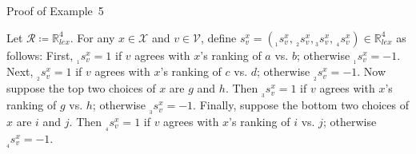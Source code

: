 \documentclass[
]{article}
\begin{document}
Proof of Example~5

Let \(\mathcal{R} ≔ \mathbb{R}_{lex}^{4}\). For any
\(x \in \mathcal{X}\) and \(v \in \mathcal{V}\), define
\(s_{v}^{x} = \left( {}_{{}_{1}}s_{v}^{x},\,{}_{{}_{2}}s_{v}^{x},{}_{{}_{3}}s_{v}^{x},\,{}_{{}_{4}}s_{v}^{x} \right) \in \mathbb{R}_{lex}^{4}\)
as follows: First, \({}_{{}_{1}}s_{v}^{x} = 1\) if \(v\) agrees with
\(x\)'s ranking of \(a\) vs. \(b\); otherwise
\({}_{{}_{1}}s_{v}^{x} = - 1\). Next, \({}_{{}_{2}}s_{v}^{x} = 1\) if
\(v\) agrees with \(x\)'s ranking of \(c\) vs. \(d\); otherwise
\({}_{{}_{2}}s_{v}^{x} = - 1\). Now suppose the top two choices of \(x\)
are \(g\) and \(h\). Then \({}_{{}_{3}}s_{v}^{x} = 1\) if \(v\) agrees
with \(x\)'s ranking of \(g\) vs. \(h\); otherwise
\({}_{{}_{3}}s_{v}^{x} = - 1\). Finally, suppose the bottom two choices
of \(x\) are \(i\) and \(j\). Then \({}_{{}_{4}}s_{v}^{x} = 1\) if \(v\)
agrees with \(x\)'s ranking of \(i\) vs. \(j\); otherwise
\({}_{{}_{4}}s_{v}^{x} = - 1\).
\end{document}
